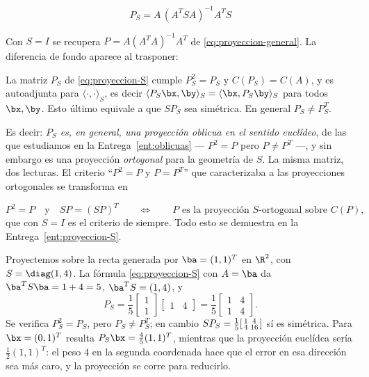 \begin{equation}\label{eq:proyeccion-S}
\boxed{\ P_S=A\,(A^TSA)^{-1}A^TS\ }
\end{equation}

Con $S=I$ se recupera $P=A(A^TA)^{-1}A^T$ de
\eqref{eq:proyeccion-general}. La diferencia de fondo aparece al trasponer:

\begin{proposition}\label{prop:PS}
La matriz $P_S$ de \eqref{eq:proyeccion-S} cumple $P_S^2=P_S$ y $C(P_S)=C(A)$,
y es autoadjunta para $\langle\cdot,\cdot\rangle_S$, es decir
$\langle P_S\bx,\by\rangle_S=\langle\bx,P_S\by\rangle_S$ para todos
$\bx,\by$. Esto último equivale a que $SP_S$ sea simétrica. En general
$P_S\neq P_S^T$.
\end{proposition}

Es decir: \emph{$P_S$ es, en general, una proyección oblicua en el sentido
euclídeo}, de las que estudiamos en la Entrega~\ref{ent:oblicuas} --- $P^2=P$
pero $P\neq P^T$ ---, y sin embargo es una proyección \emph{ortogonal} para
la geometría de $S$. La misma matriz, dos lecturas. El criterio
``$P^2=P$ y $P=P^T$'' que caracterizaba a las proyecciones ortogonales se
transforma en

\begin{equation}\label{eq:criterio-PS}
P^2=P \quad\text{y}\quad SP=(SP)^T
\qquad\Longleftrightarrow\qquad
P \text{ es la proyección $S$-ortogonal sobre } C(P),
\end{equation}
que con $S=I$ es el criterio de siempre. Todo esto se demuestra en la
Entrega~\ref{ent:proyeccion-S}.

\begin{example}\label{ej:PS-recta}
Proyectemos sobre la recta generada por $\ba=(1,1)^T$ en $\R^2$, con
$S=\diag(1,4)$. La fórmula \eqref{eq:proyeccion-S} con $A=\ba$ da
$\ba^TS\ba=1+4=5$, $\ba^TS=(1,4)$, y
\[
P_S=\frac{1}{5}\begin{bmatrix}1\\ 1\end{bmatrix}\begin{bmatrix}1&4\end{bmatrix}
=\frac15\begin{bmatrix}1&4\\ 1&4\end{bmatrix} .
\]
Se verifica $P_S^2=P_S$, pero $P_S\neq P_S^T$; en cambio
$SP_S=\frac15\begin{bsmallmatrix}1&4\\ 4&16\end{bsmallmatrix}$ sí es
simétrica. Para $\bx=(0,1)^T$ resulta $P_S\bx=\frac45(1,1)^T$, mientras que
la proyección euclídea sería $\frac12(1,1)^T$: el peso $4$ en la segunda
coordenada hace que el error en esa dirección sea más caro, y la proyección
se corre para reducirlo.
\end{example}

